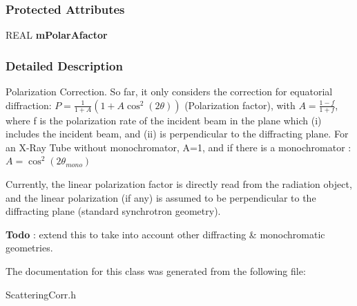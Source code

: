 \subsubsection*{Protected Attributes}
\begin{DoxyCompactItemize}
\item 
REAL {\bfseries mPolarAfactor}\label{a00060_a8a0115cf6d539ede891056f94b6887cf}

\end{DoxyCompactItemize}


\subsubsection{Detailed Description}
Polarization Correction. So far, it only considers the correction for equatorial diffraction: $ P = \frac{1}{1+A}\left(1+A\cos^2(2\theta)\right) $ (Polarization factor), with $ A = \frac{1-f}{1+f} $, where f is the polarization rate of the incident beam in the plane which (i) includes the incident beam, and (ii) is perpendicular to the diffracting plane. For an X-\/Ray Tube without monochromator, A=1, and if there is a monochromator : $ A = \cos^2(2\theta_{mono}) $

Currently, the linear polarization factor is directly read from the radiation object, and the linear polarization (if any) is assumed to be perpendicular to the diffracting plane (standard synchrotron geometry).

\begin{Desc}
\item[{\bf Todo}]: extend this to take into account other diffracting \& monochromatic geometries. \end{Desc}


The documentation for this class was generated from the following file:\begin{DoxyCompactItemize}
\item 
ScatteringCorr.h\end{DoxyCompactItemize}
